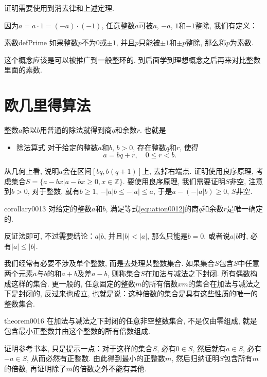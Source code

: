 证明需要使用到消去律和上述定理. 

因为$a=a \cdot 1 = (-a) \cdot (-1)$, 任意整数$a$可被$a$, $-a$, $1$和$-1$整除, 我们有定义：
\begin{definition}{素数}{defPrime}
如果整数$p$不为0或$\pm{}1$, 并且$p$只能被$\pm{}1$和$\pm{}p$整除, 那么称$p$为素数. 
\end{definition}
这个概念应该是可以被推广到一般整环的. 到后面学到理想概念之后再来对比整数里面的素数. 

\section{欧几里得算法}
整数$a$除以$b$用普通的除法就得到商$q$和余数$r$. 也就是
\begin{itemize}
\item \textcolor{main}{除法算式} 对于给定的整数$a$和$b$, $b>0$, 存在整数$q$和$r$, 使得
\begin{equation}\label{equation0012}
a = bq + r, \quad 0 \le r < b.
\end{equation}
\end{itemize}

从几何上看, 说明$a$会在区间$[bq, b(q+1)]$上, 去掉右端点. 证明使用良序原理, 考虑集合$S = \{a-bx|a-bx \ge 0, x \in \mathbb{Z}\}$. 要使用良序原理, 我们需要证明$S$非空, 注意到$b>0$, 对于整数, 就有$b \ge 1$, $-|a|b \le -|a| \le a$, 于是$a - (-|a|b) \ge 0$, $S$非空. 

\begin{corollary}{}{corollary0013}
对给定的整数$a$和$b$, 满足等式\ref{equation0012}的商$q$和余数$r$是唯一确定的. 
\end{corollary}

反证法即可, 不过需要结论：$a|b$, 并且$|b| < |a|$, 那么只能是$b = 0$. 或者说$a|b$时, 必有$|a| \le |b|$. 

我们经常有必要不涉及单个整数, 而是去处理某整数集合. 如果集合$S$包含$S$中任意两个元素$a$与$b$的和$a+b$及差$a-b$, 则称集合$S$在加法与减法之下封闭. 所有偶数构成这样的集合. 更一般的, 任意固定的整数$m$的所有倍数$xm$的集合在加法与减法之下是封闭的, 反过来也成立, 也就是说：这种倍数的集合是具有这些性质的唯一的整数集合. 
\begin{theorem}{}{theorem0016}
在加法与减法之下封闭的任意非空整数集合, 不是仅由零组成, 就是包含最小正整数并由这个整数的所有倍数组成. 
\end{theorem}

证明参考书本, 只是提示一点：对于这样的集合$S$, 必有$0 \in S$, 然后就有$a \in S$, 必有$-a \in S$, 从而必然有正整数. 由此得到最小的正整数$m$, 然后归纳证明$S$包含所有$m$的倍数, 再证明除了$m$的倍数之外不能有其他. 

